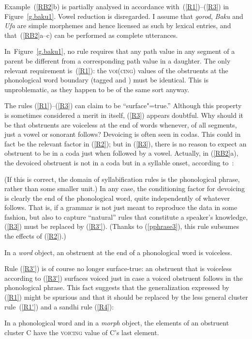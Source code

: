 \documentclass[output=paper]{langsci/langscibook}
\begin{document}
Example~(\ref{RB2}b) is partially analysed in accordance
with~(\ref{R1})--(\ref{R3}) in Figure~\ref{g.baku1}. Vowel reduction is
disregarded. I assume that \emph{go\-rod}, \emph{Baku} and \emph{Ufa} are
simple morphemes and hence licensed as such by lexical entries, and
that~(\ref{RB2}a--c) can be performed as complete utterances.

In~Figure~\ref{g.baku1}, no rule requires that any path value in any segment
of a parent be different from a corresponding path value in a daughter. The
only relevant requirement is~(\ref{R1}): the \textsc{voi(cing)} values of the
obstruents at the phonological word boundary (tagged  and )
must be identical. This is unproblematic, as they happen to be of the same
sort anyway.

The rules (\ref{R1})--(\ref{R3}) can claim to be ``surface"=true.'' Although
this property is sometimes considered a merit in itself, (\ref{R3}) appears
doubtful. Why should it be that obstruents are voiceless at the end of
words whenever, of all segments, just a vowel or sonorant follows?
Devoicing is often seen in codas. This could in fact be the relevant factor
in (\ref{R2}); but in (\ref{R3}), there is no reason to expect an obstruent
to be in a coda just when followed by a vowel. Actually, in (\ref{RB2}a),
the devoiced obstruent is not in a coda but in a syllable onset, according
to~\cite[76]{weis:87}:
\begin{exe}
\ex
\label{gor}
\textipa{[gO.r@.tu.fa]}
\end{exe}
%
(If this is correct, the domain of syllabification rules is the
phonological phrase, rather than some smaller unit.) In any case, the
conditioning factor for devoicing is clearly the end of the phonological
word, quite independently of whatever follows.  That is, if a grammar is
not just meant to reproduce the data in some fashion, but also to capture
``natural'' rules that constitute a speaker's knowledge, (\ref{R3}) must be
replaced by (\ref{R3'}). (Thanks to (\ref{pphrase3}), this rule subsumes
the effects of (\ref{R2}).)
%
\begin{exe}
\ex
\label{R3'} 
In a \emph{word} object, an obstruent at the end of a phonological word is
voiceless.
\end{exe}
%

Rule (\ref{R3'}) is of course no longer surface-true: an obstruent that is
voice\-less according to (\ref{R3'}) surfaces voiced just in case a voiced
obstruent follows in the phonological phrase.  This fact suggests that the
generalization expressed by (\ref{R1}) might be spurious and that it should
be replaced by the less general cluster rule~(\ref{R1'}) and a sandhi
rule (\ref{R4}):
%
\begin{exe}
\ex
\label{R1'} In a phonological word and in a \textit{morph}\/
  object, the elements of an obstruent cluster C have the \textsc{voicing}
  value of C's last element.
\end{exe}
\end{document}
